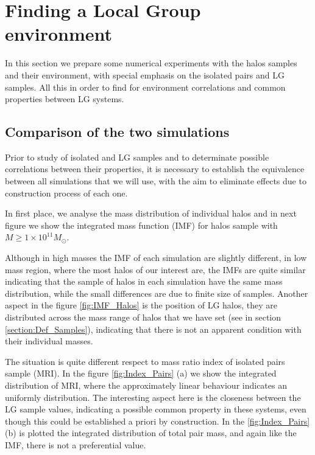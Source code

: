 \documentclass[usenatbib]{latex/mn2e}
\begin{document}
\section{Finding a Local Group environment}
\label{sec:experiments}



In this section we prepare some numerical experiments with the halos 
samples and their environment, with special emphasis on the isolated pairs 
and LG samples. All this in order to find for environment correlations and 
common properties between LG systems.


\subsection{Comparison of the two simulations}
\label{subsec:comparison_simulations}


Prior to study of isolated and LG samples and to determinate possible 
correlations between their properties, it is necessary to establish the 
equivalence between all simulations that we will use, with the aim to 
eliminate effects due to construction process of each one.


In first place, we analyse the mass distribution of individual halos and 
in next figure we show the integrated mass function (IMF) for halos sample
with $M \geq 1\times 10^{11} M_{\odot}$.


Although in high masses the IMF of each simulation are slightly different, 
in low mass region, where the most halos of our interest are, the IMFs are 
quite similar indicating that the sample of halos in each simulation have 
the same mass distribution, while the small differences are due to finite 
size of samples. Another aspect in the figure \ref{fig:IMF_Halos} is the 
position of LG halos, they are distributed across the mass range of halos 
that we have set (see in section \ref{section:Def_Samples}), indicating 
that there is not an apparent condition with their individual masses.



The situation is quite different respect to mass ratio index of isolated 
pairs sample (MRI). In the figure \ref{fig:Index_Pairs} (a) we show the 
integrated distribution of MRI, where the approximately linear behaviour 
indicates an uniformly distribution. The interesting aspect here is the 
closeness between the LG sample values, indicating a possible common 
property in these systems, even though this could be established a priori 
by construction. In the \ref{fig:Index_Pairs} (b) is plotted the 
integrated distribution of total pair mass, and again like the IMF, there 
is not a preferential value.
\end{document}
